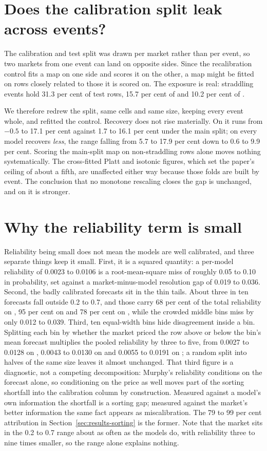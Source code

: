 \section{Does the calibration split leak across events?}
\label{app:splitcheck}
The calibration and test split was drawn per market rather than per event, so
two markets from one event can land on opposite sides. Since the recalibration
control fits a map on one side and scores it on the other, a map might be fitted
on rows closely related to those it is scored on. The exposure is real:
straddling events hold 31.3 per cent of \winA test rows, 15.7 per cent of \winB
and 10.2 per cent of \winC.

We therefore redrew the split, same cells and same size, keeping every event
whole, and refitted the control. Recovery does not rise materially. On \winB it runs
from $-0.5$ to 17.1 per cent against 1.7 to 16.1 per cent under the main split; on \winC every model recovers \emph{less}, the range falling from 5.7 to
17.9 per cent down to 0.6 to 9.9 per cent. Scoring the main-split map on
non-straddling rows alone moves nothing systematically. The cross-fitted Platt
and isotonic figures, which set the paper's ceiling of about a fifth, are
unaffected either way because those folds are built by event. The
conclusion that no monotone rescaling closes the gap is unchanged, and on \winC
it is stronger.

\section{Why the reliability term is small}
\label{app:relsmall}
Reliability being small does not mean the models are well calibrated, and three
separate things keep it small. First, it is a squared quantity: a per-model
reliability of 0.0023 to 0.0106 is a root-mean-square miss of roughly 0.05 to
0.10 in probability, set against a market-minus-model resolution gap of 0.019 to 0.036.
Second, the badly calibrated forecasts sit in the thin tails. About three in ten
forecasts fall outside 0.2 to 0.7, and those carry 68 per cent of the total
reliability on \winA, 95 per cent on \winB and 78 per cent on \winC, while the
crowded middle bins miss by only 0.012 to 0.039. Third, ten equal-width bins
hide disagreement inside a bin. Splitting each bin by whether the market priced
the row above or below the bin's mean forecast multiplies the pooled
reliability by three to five, from 0.0027 to 0.0128 on \winA, 0.0043 to 0.0130 on \winB and
0.0055 to 0.0191 on \winC; a random split into halves of the same size leaves it
almost unchanged. That third figure is a diagnostic, not a competing
decomposition: Murphy's reliability conditions on the forecast alone, so
conditioning on the price as well moves part of the sorting shortfall into the
calibration column by construction. Measured against a model's own information
the shortfall is a sorting gap; measured against the market's better information
the same fact appears as miscalibration. The 79 to 99 per cent attribution in
Section~\ref{sec:results-sorting} is the former. Note that the market sits in the 0.2 to 0.7 range about as
often as the models do, with reliability three to nine times smaller, so the
range alone explains nothing.

